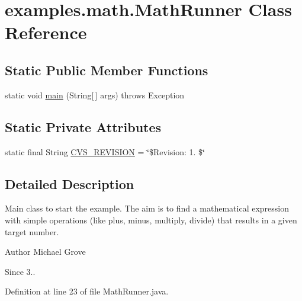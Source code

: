 \hypertarget{classexamples_1_1math_1_1_math_runner}{\section{examples.\-math.\-Math\-Runner Class Reference}
\label{classexamples_1_1math_1_1_math_runner}
}
\subsection*{Static Public Member Functions}
\begin{DoxyCompactItemize}
\item 
static void \hyperlink{classexamples_1_1math_1_1_math_runner_ac2e9c401b472d6896928d711636f54a2}{main} (String\mbox{[}$\,$\mbox{]} args)  throws Exception 
\end{DoxyCompactItemize}
\subsection*{Static Private Attributes}
\begin{DoxyCompactItemize}
\item 
static final String \hyperlink{classexamples_1_1math_1_1_math_runner_aec69f14d66b2d0e486aaac242478e0f4}{C\-V\-S\-\_\-\-R\-E\-V\-I\-S\-I\-O\-N} = \char`\"{}\$Revision\-: 1. \$\char`\"{}
\end{DoxyCompactItemize}


\subsection{Detailed Description}
Main class to start the example. The aim is to find a mathematical expression with simple operations (like plus, minus, multiply, divide) that results in a given target number.

\begin{DoxyAuthor}{Author}
Michael Grove 
\end{DoxyAuthor}
\begin{DoxySince}{Since}
3.. 
\end{DoxySince}


Definition at line 23 of file Math\-Runner.\-java.



